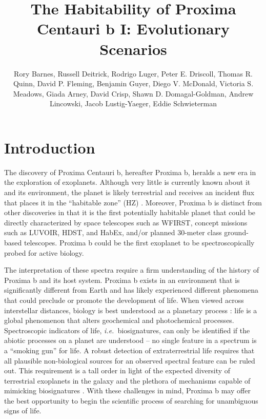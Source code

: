 \documentclass[preprint,12pt]{aastex}
\newcommand{\xxx}[1]{{\color{red} #1}} %
\def\ie{{\it i.e.\ }}
\begin{document}
\title{The Habitability of Proxima Centauri b I: Evolutionary Scenarios}
\author{Rory Barnes, Russell Deitrick, Rodrigo Luger, Peter E. Driscoll, Thomas R. Quinn, David P. Fleming, Benjamin Guyer, Diego V. McDonald, Victoria S. Meadows, Giada Arney, David Crisp, Shawn D. Domagal-Goldman, Andrew Lincowski, Jacob Lustig-Yaeger, Eddie Schwieterman}

\begin{abstract}
\end{abstract}

\section{Introduction\label{sec:intro}}

The discovery of Proxima Centauri b, hereafter Proxima b, heralds a
new era in the exploration of exoplanets. Although very little is
currently known about it and its environment, the planet is likely
terrestrial and receives an incident flux that places it in the
``habitable zone'' (HZ)
\citep{Kasting93,Selsis07,Kopparapu13}. Moreover, Proxima b is
distinct from other discoveries in that it is the first potentially
habitable planet that could be directly characterized by space
telescopes such as WFIRST, concept missions such as LUVOIR, HDST, and
HabEx, and/or planned 30-meter class ground-based telescopes. Proxima
b could be the first exoplanet to be spectroscopically probed for
active biology.

The interpretation of these spectra require a firm understanding of
the history of Proxima b and its host system. Proxima b exists in an
environment that is significantly different from Earth and has likely
experienced different phenomena that could preclude or promote the
development of life. When viewed across interstellar distances,
biology is best understood as a planetary process \xxx{:} life is a global
phenomenon that alters geochemical and photochemical
processes. Spectroscopic indicators of life, \ie biosignatures, can
only be identified if the abiotic processes on a planet are understood
-- no single feature in a spectrum is a ``smoking gun'' for life. A
robust detection of extraterrestrial life requires that all plausible
non-biological sources for an observed spectral feature can be ruled
out. This requirement is a tall order in light of the expected
diversity of terrestrial exoplanets in the galaxy and the plethora of
mechanisms capable of mimicking biosignatures
\citep{Schwieterman16,Meadows16}.  With these challenges in mind,
Proxima b may offer the best opportunity to begin the scientific
process of searching for unambiguous signs of life.
\end{document}
